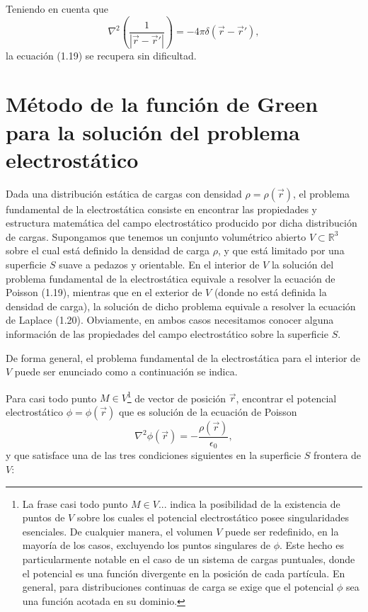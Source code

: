 \documentclass[12pt,a4paper]{book}
\begin{document}
Teniendo en cuenta que
\begin{equation}
\nabla^2 \left( \frac{1}{|\vec{r} - \vec{r}'|} \right) = -4\pi\delta(\vec{r} - \vec{r}'),
\end{equation}
la ecuación (1.19) se recupera sin dificultad.

\section{Método de la función de Green para la solución del problema electrostático}

Dada una distribución estática de cargas con densidad $\rho = \rho(\vec{r})$, el problema fundamental de la electrostática consiste en encontrar las propiedades y estructura matemática del campo electrostático producido por dicha distribución de cargas. Supongamos que tenemos un conjunto volumétrico abierto $V \subset \mathbb{R}^3$ sobre el cual está definido la densidad de carga $\rho$, y que está limitado por una superficie $S$ suave a pedazos y orientable. En el interior de $V$ la solución del problema fundamental de la electrostática equivale a resolver la ecuación de Poisson (1.19), mientras que en el exterior de $V$ (donde no está definida la densidad de carga), la solución de dicho problema equivale a resolver la ecuación de Laplace (1.20). Obviamente, en ambos casos necesitamos conocer alguna información de las propiedades del campo electrostático sobre la superficie $S$.

De forma general, el problema fundamental de la electrostática para el interior de $V$ puede ser enunciado como a continuación se indica.

Para casi todo punto $M \in V$\footnote{La frase casi todo punto $M \in V$... indica la posibilidad de la existencia de puntos de $V$ sobre los cuales el potencial electrostático posee singularidades esenciales. De cualquier manera, el volumen $V$ puede ser redefinido, en la mayoría de los casos, excluyendo los puntos singulares de $\phi$. Este hecho es particularmente notable en el caso de un sistema de cargas puntuales, donde el potencial es una función divergente en la posición de cada partícula. En general, para distribuciones continuas de carga se exige que el potencial $\phi$ sea una función acotada en su dominio.} de vector de posición $\vec{r}$, encontrar el potencial electrostático $\phi = \phi(\vec{r})$ que es solución de la ecuación de Poisson
\begin{equation}
\nabla^2 \phi(\vec{r}) = -\frac{\rho(\vec{r})}{\epsilon_0},
\end{equation}
y que satisface una de las tres condiciones siguientes en la superficie $S$ frontera de $V$:
\end{document}

